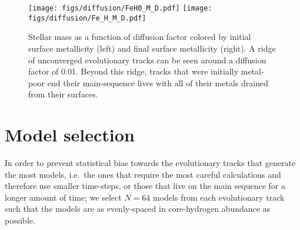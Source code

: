 \documentclass[iop,apj,twocolappendix]{emulateapj}
\begin{document}
\begin{figure*}
    \centering
    \texttt{[image: figs/diffusion/FeH0\_M\_D.pdf]}\hfill
    \texttt{[image: figs/diffusion/Fe\_H\_M\_D.pdf]}
    \caption{Stellar mass as a function of diffusion factor colored by initial surface metallicity (left) and final surface metallicity (right). A ridge of unconverged evolutionary tracks can be seen around a diffusion factor of 0.01. Beyond this ridge, tracks that were initially metal-poor end their main-sequence lives with all of their metals drained from their surfaces. } 
    \label{fig:diffusion-gap}
\end{figure*}


\section{Model selection}
\label{sec:selection}
In order to prevent statistical bias towards the evolutionary tracks that generate the most models, i.e.\ the ones that require the most careful calculations and therefore use smaller time-steps, or those that live on the main sequence for a longer amount of time; we select $N=64$ models from each evolutionary track such that the models are as evenly-spaced in core-hydrogen abundance as possible. 
\end{document}
